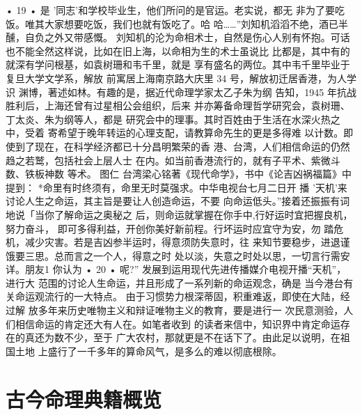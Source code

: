 • 19 •
是 '同志'和学校毕业生，他们所问的是官运。老实说，都无
非为了要吃饭。唯其大家想要吃饭，我们也就有饭吃了。哈
哈……”刘知机滔滔不绝，酒已半醺，自负之外又带感慨。
刘知机的沦为命相术士，自然是伤心人别有怀抱。可话
也不能全然这样说，比如在旧上海，以命相为生的术士虽说比
比都是，其中有的就深有学问根基，如袁树珊和韦千里，就是
享有盛名的两位。其中韦千里毕业于复旦大学文学系，解放
前寓居上海南京路大庆里 34 号，解放初迁居香港，为人学识
渊博，著述如林。有趣的是，据近代命理学家太乙子朱为纲
告知，1945 年抗战胜利后，上海还曾有过星相公会组织，后来
并亦筹备命理哲学研究会，袁树珊、丁太炎、朱为纲等人，都是
研究会中的理事。其时百姓由于生活在水深火热之中，受着
寄希望于晚年转运的心理支配，请教算命先生的更是多得难
以计数。即使到了现在，在科学经济都已十分昌明繁荣的香
港、台湾，人们相信命运的仍然趋之若鹫，包括社会上层人士
在内。如当前香港流行的，就有子平术、紫微斗数、铁板神数
等术。 图仁
台湾梁心铭著《现代命学》，书中《论吉凶祸福篇》中提到：
*命里有时终须有，命里无时莫强求。中华电视台七月二日开
播 '天机'来讨论人生之命运，其主旨是要让人创造命运，不要
向命运低头。”接着还振振有词地说「当你了解命运之奥秘之
后，则命运就掌握在你手中,行好运时宜把握良机，努力奋斗，
即可多得利益，开创你美好新前程。行坏运时应宜守为安，勿
踏危机，减少灾害。若是吉凶参半运时，得意须防失意时，往
来知节要稳步，进退谨饿要三思。总而言之一个人，得意之时
处以淡，失意之时处以思，一切言行需安详。朋友1 你认为
• 20 •
呢?”
发展到运用现代先进传播媒介电视开播“天机”， 进行大
范围的讨论人生命运，并且形成了一系列新的命运观念，确是
当今港台有关命运观流行的一大特点。
由于习惯势力根深蒂固，积重难返，即使在大陆，经过解
放多年来历史唯物主义和辩证唯物主义的教育，要是进行一
次民意测验，人们相信命运的肯定还大有人在。如笔者收到
的读者来信中，知识界中肯定命运存在的真还为数不少，至于
广大农村，那就更是不在话下了。由此足以说明，在祖国土地
上盛行了一千多年的算命风气，是多么的难以彻底根除。

\section{古今命理典籍概览}


